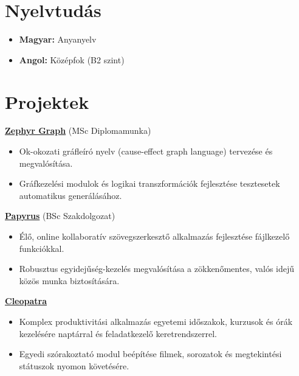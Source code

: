 \documentclass[11pt,a4paper]{article}
\begin{document}
\section{Nyelvtudás}
\begin{itemize}[leftmargin=0pt, label={}]
    \item \textbf{Magyar:} Anyanyelv
    \item \textbf{Angol:} Középfok (B2 szint)
\end{itemize}

\section{Projektek}
\textbf{\href{https://github.com/ZephyrGraph}{Zephyr Graph}} (MSc Diplomamunka)
\begin{itemize}[noitemsep,topsep=2pt,leftmargin=0.15in]
    \item Ok-okozati gráfleíró nyelv (cause-effect graph language) tervezése és megvalósítása.
    \item Gráfkezelési modulok és logikai transzformációk fejlesztése tesztesetek automatikus generálásához.
\end{itemize}

\vspace{4pt}
\textbf{\href{https://github.com/Papyrus}{Papyrus}} (BSc Szakdolgozat)
\begin{itemize}[noitemsep,topsep=2pt,leftmargin=0.15in]
    \item Élő, online kollaboratív szövegszerkesztő alkalmazás fejlesztése fájlkezelő funkciókkal.
    \item Robusztus egyidejűség-kezelés megvalósítása a zökkenőmentes, valós idejű közös munka biztosítására.
\end{itemize}

\vspace{4pt}
\textbf{\href{https://karcags.eu:9800}{Cleopatra}}
\begin{itemize}[noitemsep,topsep=2pt,leftmargin=0.15in]
    \item Komplex produktivitási alkalmazás egyetemi időszakok, kurzusok és órák kezelésére naptárral és feladatkezelő keretrendszerrel.
    \item Egyedi szórakoztató modul beépítése filmek, sorozatok és megtekintési státuszok nyomon követésére.
\end{itemize}
\end{document}
